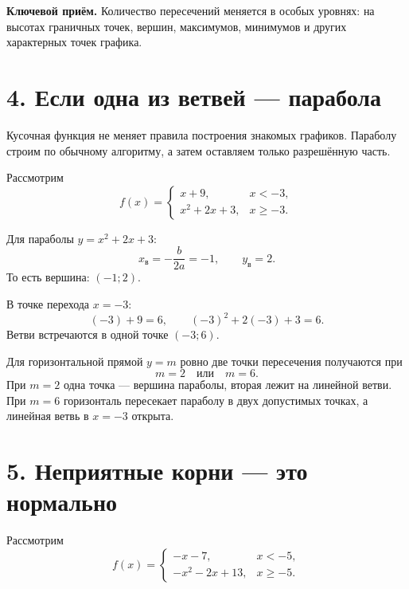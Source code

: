 \documentclass[a4paper,12pt]{article}
\newcommand{\sectionline}{\par\vspace{1mm}{\color{accent}\rule{\linewidth}{0.6pt}}\par\vspace{1mm}}
\newcommand{\warntext}[1]{\textbf{\color{warn}#1}}
\begin{document}
\warntext{Ключевой приём.} Количество пересечений меняется в особых уровнях: на высотах граничных точек, вершин, максимумов, минимумов и других характерных точек графика.

\clearpage
\section*{4. Если одна из ветвей — парабола}
\sectionline
Кусочная функция не меняет правила построения знакомых графиков. Параболу строим по обычному алгоритму, а затем оставляем только разрешённую часть.

Рассмотрим
\[
f(x)=
\begin{cases}
x+9, & x<-3,\\
x^2+2x+3, & x\ge-3.
\end{cases}
\]

Для параболы $y=x^2+2x+3$:
\[
x_{\text{в}}=-\frac{b}{2a}=-1,\qquad y_{\text{в}}=2.
\]
То есть вершина: $(-1;2)$.

В точке перехода $x=-3$:
\[
(-3)+9=6,\qquad (-3)^2+2(-3)+3=6.
\]
Ветви встречаются в одной точке $(-3;6)$.

\begin{center}
\end{center}

Для горизонтальной прямой $y=m$ ровно две точки пересечения получаются при
\[
\boxed{m=2\quad\text{или}\quad m=6}.
\]
При $m=2$ одна точка — вершина параболы, вторая лежит на линейной ветви. При $m=6$ горизонталь пересекает параболу в двух допустимых точках, а линейная ветвь в $x=-3$ открыта.

\clearpage
\section*{5. Неприятные корни — это нормально}
\sectionline
Рассмотрим
\[
f(x)=
\begin{cases}
-x-7, & x<-5,\\
-x^2-2x+13, & x\ge-5.
\end{cases}
\]
\end{document}
